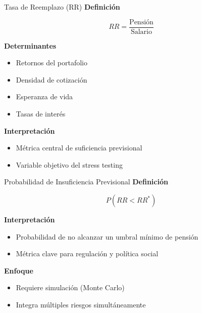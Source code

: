 \documentclass{beamer}
\begin{document}
\begin{frame}{Tasa de Reemplazo (RR)}
\textbf{Definición}

\[
RR = \frac{\text{Pensión}}{\text{Salario}}
\]

\vspace{0.3cm}

\textbf{Determinantes}
\begin{itemize}
\item Retornos del portafolio
\item Densidad de cotización
\item Esperanza de vida
\item Tasas de interés
\end{itemize}

\vspace{0.3cm}

\textbf{Interpretación}
\begin{itemize}
\item Métrica central de suficiencia previsional
\item Variable objetivo del stress testing
\end{itemize}
\end{frame}

\begin{frame}{Probabilidad de Insuficiencia Previsional}
\textbf{Definición}

\[
P(RR < RR^*)
\]

\vspace{0.3cm}

\textbf{Interpretación}
\begin{itemize}
\item Probabilidad de no alcanzar un umbral mínimo de pensión
\item Métrica clave para regulación y política social
\end{itemize}

\vspace{0.3cm}

\textbf{Enfoque}
\begin{itemize}
\item Requiere simulación (Monte Carlo)
\item Integra múltiples riesgos simultáneamente
\end{itemize}
\end{frame}
\end{document}

